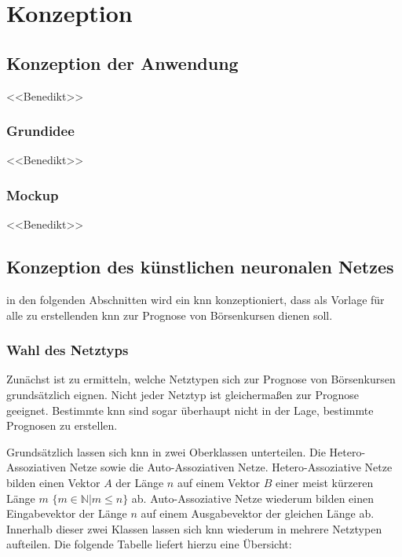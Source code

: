 \chapter{Konzeption}
\label{chapter:Konzeption}

\section{Konzeption der Anwendung} %
\label{section:Konzeption der Anwendung} %
<<Benedikt>>

\subsection{Grundidee} %
\label{subsection:Grundidee} %
<<Benedikt>>

\subsection{Mockup} %
\label{subsection:Mockup} %
<<Benedikt>>

\section{Konzeption des künstlichen neuronalen Netzes}
\label{section:Konzeption des künstlichen neuronalen Netzes}

in den folgenden Abschnitten wird ein \acs{knn} konzeptioniert, dass als Vorlage für alle zu erstellenden \acs{knn} zur Prognose von Börsenkursen dienen soll. 

\subsection{Wahl des Netztyps}
\label{subsection:Wahl des Netztyps}
Zunächst ist zu ermitteln, welche Netztypen sich zur Prognose von Börsenkursen grundsätzlich eignen. Nicht jeder Netztyp ist gleichermaßen zur Prognose geeignet. Bestimmte \acs{knn} sind sogar überhaupt nicht in der Lage, bestimmte Prognosen zu erstellen. 

Grundsätzlich lassen sich \acs{knn} in zwei Oberklassen unterteilen. Die Hetero-Assoziativen Netze sowie die Auto-Assoziativen Netze. Hetero-Assoziative Netze bilden einen Vektor $A$ der Länge $n$ auf einem Vektor $B$ einer meist kürzeren Länge $m$ $\{m \in \mathbb{N} | m \le n\}$ ab. Auto-Assoziative Netze wiederum bilden einen Eingabevektor der Länge $n$ auf einem Ausgabevektor der gleichen Länge ab. Innerhalb dieser zwei Klassen lassen sich \acs{knn} wiederum in mehrere Netztypen aufteilen. Die folgende Tabelle liefert hierzu eine Übersicht:

